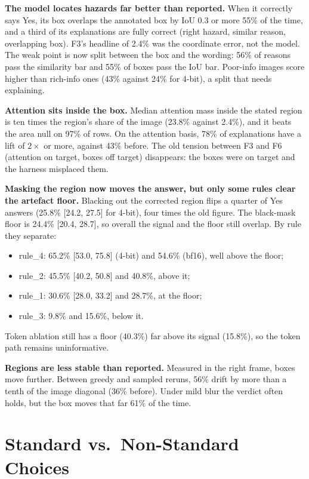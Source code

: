 \textbf{The model locates hazards far better than reported.} When it correctly says Yes, its box overlaps
the annotated box by IoU 0.3 or more 55\% of the time, and a third of its explanations are fully correct
(right hazard, similar reason, overlapping box). F3's headline of 2.4\% was the coordinate error, not the
model. The weak point is now split between the box and the wording: 56\% of reasons pass the similarity
bar and 55\% of boxes pass the IoU bar. Poor-info images score higher than rich-info ones (43\% against
24\% for 4-bit), a split that needs explaining.

\textbf{Attention sits inside the box.} Median attention mass inside the stated region is ten times the
region's share of the image (23.8\% against 2.4\%), and it beats the area null on 97\% of rows. On the
attention basis, 78\% of explanations have a lift of $2\times$ or more, against 43\% before. The old
tension between F3 and F6 (attention on target, boxes off target) disappears: the boxes were on target
and the harness misplaced them.

\textbf{Masking the region now moves the answer, but only some rules clear the artefact floor.} Blacking
out the corrected region flips a quarter of Yes answers (25.8\% [24.2, 27.5] for 4-bit), four times the
old figure. The black-mask floor is 24.4\% [20.4, 28.7], so overall the signal and the floor still
overlap. By rule they separate:
\begin{itemize}
\item rule\_4: 65.2\% [53.0, 75.8] (4-bit) and 54.6\% (bf16), well above the floor;
\item rule\_2: 45.5\% [40.2, 50.8] and 40.8\%, above it;
\item rule\_1: 30.6\% [28.0, 33.2] and 28.7\%, at the floor;
\item rule\_3: 9.8\% and 15.6\%, below it.
\end{itemize}
Token ablation still has a floor (40.3\%) far above its signal (15.8\%), so the token path remains
uninformative.

\textbf{Regions are less stable than reported.} Measured in the right frame, boxes move further. Between
greedy and sampled reruns, 56\% drift by more than a tenth of the image diagonal (36\% before). Under mild
blur the verdict often holds, but the box moves that far 61\% of the time.

\section{Standard vs.\ Non-Standard Choices}

